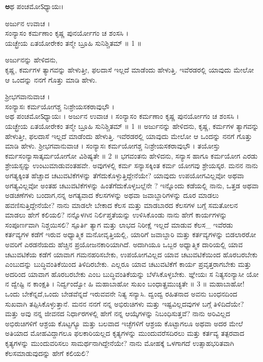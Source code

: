 \kanfont
\begin{center}\aksharfont\textbf
ಅಥ ಪಂಚಮೋऽಧ್ಯಾಯಃ।\\
\end{center}
ಅರ್ಜುನ ಉವಾಚ ।\\
ಸಂನ್ಯಾಸಂ ಕರ್ಮಣಾಂ ಕೃಷ್ಣ ಪುನರ್ಯೋಗಂ ಚ ಶಂಸಸಿ ।\\
ಯಚ್ಛ್ರೇಯ ಏತಯೋರೇಕಂ ತನ್ಮೇ ಬ್ರೂಹಿ ಸುನಿಶ್ಚಿತಮ್ ॥ 1 ॥
\begin{quoting}
ಅರ್ಜುನನ್ನು ಹೇಳಿದನು,\\
ಕೃಷ್ಣ, ಕರ್ಮಗಳ ತ್ಯಾಗವನ್ನು ಹೇಳುತ್ತೀ,  ಫಲದಾಸೆ ಇಲ್ಲದೆ ಮಾಡೆಂದು ಹೇಳುತ್ತಿ. ಇವೆರಡರಲ್ಲಿ ಯಾವುದು ಮೇಲೋ ಆ ಒಂದನ್ನು ನನಗೆ ಗೊತ್ತು ಮಾಡಿ ಹೇಳು.\\
\end{quoting}
ಶ್ರೀಭಗವಾನುವಾಚ ।\\
ಸಂನ್ಯಾಸಃ ಕರ್ಮಯೋಗಶ್ಚ ನಿಃಶ್ರೇಯಸಕರಾವುಭೌ ।\\ಅಥ ಪಂಚಮೋऽಧ್ಯಾಯಃ ।
ಅರ್ಜುನ ಉವಾಚ ।
ಸಂನ್ಯಾಸಂ ಕರ್ಮಣಾಂ ಕೃಷ್ಣ ಪುನರ್ಯೋಗಂ ಚ ಶಂಸಸಿ ।
ಯಚ್ಛ್ರೇಯ ಏತಯೋರೇಕಂ ತನ್ಮೇ ಬ್ರೂಹಿ ಸುನಿಶ್ಚಿತಮ್ ॥ 1 ॥
 ಅರ್ಜುನನ್ನು ಹೇಳಿದನು,
 ಕೃಷ್ಣ, ಕರ್ಮಗಳ ತ್ಯಾಗವನ್ನು ಹೇಳುತ್ತೀ,  ಫಲದಾಸೆ ಇಲ್ಲದೆ ಮಾಡೆಂದು ಹೇಳುತ್ತಿ. ಇವೆರಡರಲ್ಲಿ ಯಾವುದು ಮೇಲೋ ಆ ಒಂದನ್ನು ನನಗೆ ಗೊತ್ತು ಮಾಡಿ ಹೇಳು.
ಶ್ರೀಭಗವಾನುವಾಚ ।
ಸಂನ್ಯಾಸಃ ಕರ್ಮಯೋಗಶ್ಚ ನಿಃಶ್ರೇಯಸಕರಾವುಭೌ ।
ತಯೋಸ್ತು ಕರ್ಮಸಂನ್ಯಾಸಾತ್ಕರ್ಮಯೋಗೋ ವಿಶಿಷ್ಯತೇ ॥ 2 ॥
 ಭಗವಂತನು ಹೇಳಿದನು,
 ಸನ್ಯಾಸ ಹಾಗೂ ಕರ್ಮಯೋಗ ಎರಡು ಶ್ರೇಯಸ್ಸನ್ನು ಉಂಟುಮಾಡುವಂತಹವೇ. ಅವುಗಳಲ್ಲಿ ಕರ್ಮ ಸನ್ಯಾಸಕ್ಕಿಂತ ಕರ್ಮ ಯೋಗವು ಶ್ರೇಯಸ್ಕರ.
ಮನನ 
 ನಾನು ಅಗತ್ಯಕ್ಕಿಂತ ಹೆಚ್ಚಾದ ಚಟುವಟಿಕೆಗಳನ್ನು ತೆಗೆದುಕೊಳ್ಳುತ್ತಿದ್ದೇನೆಯೇ? ಯಾವುದು ಉಪಯೋಗವಿಲ್ಲವೋ ಅಥವಾ ಅಗತ್ಯವಿಲ್ಲವೋ ಅಂತಹ ಚಟುವಟಿಕೆಗಳನ್ನು ಹಿಂತೆಗೆದುಕೊಳ್ಳಬಲ್ಲೆನೇ ? ಇನ್ನೊಂದು ಕಡೆಯಲ್ಲಿ ನಾನು, ಒತ್ತಡ ಅಥವಾ ಅಡಚಣೆಗಳು ಬಂದಾಗ,ನನ್ನ ಅಗತ್ಯವಾದ ಕೆಲಸಗಳನ್ನು ಅಥವಾ ಜವಾಬ್ದಾರಿಗಳನ್ನು ದೂರ ಮಾಡಲು ಹವಣಿಸುತ್ತಿದ್ದೇನೆಯೇ? ನಾನು ಮಾಡಲೇ  ಬೇಕಾದ ಕೆಲಸ ಮತ್ತು ಮಾಡಬಾರದ ಕೆಲಸಗಳ ಬಗ್ಗೆ ಸಮತೋಲನ ಮಾಡಲು ಹೇಗೆ ಕಲಿಯಲಿ? ನನ್ನೊಳಗಿನ ನಿರ್ಲಿಪ್ತತೆಯನ್ನು ಉಳಿಸಿಕೊಂಡು ನಾನು ಹೇಗೆ ಕಾರ್ಯಗಳನ್ನು ಸಂಪೂರ್ಣವಾಗಿ ನಿಶ್ಚಯಿಸಲಿ?
 ಸ್ಪೂರ್ತಿ 
 ತ್ಯಾಗ ಮತ್ತು ಲಾಭದ ನಿರೀಕ್ಷೆ ಇಲ್ಲದೆ ಮಾಡುವ ಕೆಲಸ_ ಇವೆರಡು ಕರ್ತವ್ಯಗಳ ಕಡೆಗೆ ಇರುವ ಅಧ್ಯಾತ್ಮಿಕ ಮನೋವೃತ್ತಿಯಲ್ಲಿ, ಯಾರಿಗೆ ಜವಾಬ್ದಾರಿ ಮತ್ತು ಕರ್ತವ್ಯಗಳನ್ನು ಬಿಡಲಾರರೋ ಅವರಿಗೆ ಎರಡನೆಯದು ಹೆಚ್ಚಿನ ಪ್ರಯೋಜನಕಾರಿಯಾಗಿದೆ. ಅದಾಗಿಯೂ ಒಬ್ಬರ ಅಧ್ಯಾತ್ಮಿಕ ದಾರಿಯಲ್ಲಿ ಯಾವ ಚಟುವಟಿಕೆಯ ಕಡೆಗೆ ಯಾವಾಗ ಗಮನಹರಿಸಬೇಕು, ಉಪಯೋಗವಿಲ್ಲದ ಯಾವ ಚಟುವಟಿಕೆಯಿಂದ ಹೊರಬರಬೇಕು ಎಂಬುದನ್ನು ಬುದ್ಧಿವಂತಿಕೆಯಿಂದ ತಿಳಿದಿರಬೇಕು. ಎಲ್ಲರೂ ಯಾವ ಚಟುವಟಿಕೆಗೆ ಕಾರ್ಯ ಪ್ರವೃತ್ತರಾಗಬೇಕು ಮತ್ತು ಅದರಿಂದ ಯಾವಾಗ ಹೊರಬರಬೇಕು ಎಂಬ ಬುದ್ಧಿವಂತಿಕೆಯನ್ನು ಬೆಳೆಸಿಕೊಳ್ಳಬೇಕು.
ಙ್ಞೇಯಃ ಸ ನಿತ್ಯಸಂನ್ಯಾಸೀ ಯೋ ನ ದ್ವೇಷ್ಟಿ ನ ಕಾಂಕ್ಷತಿ ।
ನಿರ್ದ್ವಂದ್ವೋ ಹಿ ಮಹಾಬಾಹೋ ಸುಖಂ ಬಂಧಾತ್ಪ್ರಮುಚ್ಯತೇ ॥ 3 ॥
 ಮಹಾಬಾಹೋ! ಒಂದು ಬೇಕೆನ್ನದೆ,ಒಂದು ಬೇಡವೆನ್ನದೆ ಇರುವವನೇ ನಿತ್ಯ ಸನ್ಯಾಸಿ. ದ್ವಂದ್ವ ರಹಿತನಾದ ಅವನು ಬಂಧನದಿಂದ ಸುಖವಾಗಿ ತಪ್ಪಿಸಿಕೊಳ್ಳುತ್ತಾನೆ.
ಮನನ 
 ನನಗೆ ನನ್ನ ಅಭಿರುಚಿಗಳು ಮತ್ತು ಇಷ್ಟವಿಲ್ಲದವುಗಳ ಬಗ್ಗೆ ತಿಳಿದಿದೆಯೇ? ಮತ್ತು ಅವು ನನ್ನ ಜೀವನದ ನಿರ್ಧಾರಗಳಲ್ಲಿ ಹೇಗೆ ನನ್ನ ಆಯ್ಕೆಗಳನ್ನು ನಿಬಂಧಿಸುತ್ತವೆ? ನಾನು ಅರಿವಿಲ್ಲದ ಅಭಿರುಚಿಗಳಿಗೆ ಆಶ್ರಯ ಕೊಟ್ಟಗ್ಯೂ ಮತ್ತು ಬಲವಾದ ಇಚ್ಛೆಗಳಿಗೆ ಆಶ್ರಯ ಕೊಟ್ಟಾಗಲೂ ಅಥವಾ ಅದರ ಮೇಲೆ ಅತಿಯಾದ ಮೋಹವಿದ್ದಾಗಲೂ ಫಲಕಾರಿಯಲ್ಲದ ಕೃತ್ಯಗಳನ್ನು ಮುಂದುವರೆಸದಿರಲು ಮತ್ತು ಕರ್ತವ್ಯ ತತ್ಪರವಾದ ಕೃತ್ಯಗಳನ್ನು ಮುಂದುವರಿಸಲು ಸಾಮರ್ಥನಾಗಿದ್ದೇನೆಯೇ? ನಾನು ಮೋಹಕ್ಕೆ ಒಳಗಾಗದೆ ಉತ್ಸಾಹಭರಿತವಾಗಿ ಕೆಲಸಮಾಡುವುದನ್ನು ಹೇಗೆ ಕಲಿಯಲಿ?
